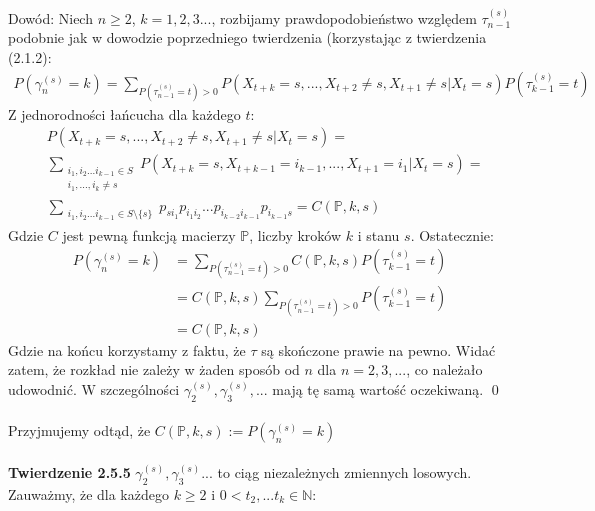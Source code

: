 \documentclass[a4paper]{article}
\begin{document}
Dowód: Niech $n\geq 2$, $k = 1,2,3...$, rozbijamy prawdopodobieństwo względem $\tau_{n-1}^{(s)}$ podobnie jak w dowodzie poprzedniego twierdzenia (korzystając z twierdzenia (2.1.2):\\
\begin{align*}
    P(\gamma_n^{(s)} = k) = \sum\limits_{P(\tau_{n-1}^{(s)} = t) > 0} P(X_{t+k} = s, ..., X_{t+2} \neq s, X_{t+1} \neq s| X_t = s)P(\tau_{k-1}^{(s)} = t) 
\end{align*}
Z jednorodności łańcucha dla każdego $t$:
\begin{align*}
    &P(X_{t+k} = s, ..., X_{t+2} \neq s, X_{t+1} \neq s| X_t = s) =\\ &\sum\limits_{\substack{i_1, i_2 ... i_{k-1} \in S\\ i_1,...,i_k \neq s}} P(X_{t+k} = s, X_{t+k-1} = i_{k-1}, ..., X_{t+1} = i_1 | X_t = s)=\\
    &\sum\limits_{\substack{i_1, i_2 ... i_{k-1} \in S\setminus \{s\}}} p_{si_1}p_{i_1 i_2}...p_{i_{k-2}i_{k-1}} p_{i_{k-1} s} = C(\mathbb{P}, k, s)
\end{align*}
Gdzie $C$ jest pewną funkcją macierzy $\mathbb{P}$, liczby kroków $k$ i stanu $s$. Ostatecznie:
\begin{align*}
    P(\gamma_n^{(s)} = k) &= \sum\limits_{P(\tau_{n-1}^{(s)} = t) > 0} C(\mathbb{P}, k, s)P(\tau_{k-1}^{(s)} = t) \\
    &= C(\mathbb{P}, k, s)\sum\limits_{P(\tau_{n-1}^{(s)} = t) > 0}P(\tau_{k-1}^{(s)} = t) \\
    &= C(\mathbb{P}, k, s)
\end{align*}
Gdzie na końcu korzystamy z faktu, że $\tau$ są skończone prawie na pewno. Widać zatem, że rozkład nie zależy w żaden sposób od $n$ dla $n = 2, 3,...$, co należało udowodnić. W szczególności $\gamma_2^{(s)}, \gamma_3^{(s)}, ...$ mają tę samą wartość oczekiwaną. \qed
\\\\
Przyjmujemy odtąd, że $C(\mathbb{P}, k, s) := P(\gamma_n^{(s)} = k)$\\
\\
\textbf{Twierdzenie 2.5.5}
$\gamma_2^{(s)}, \gamma_3^{(s)}...$ to ciąg niezależnych zmiennych losowych.\\
Zauważmy, że dla każdego $k \geq 2$ i $0 < t_2,...t_k \in \mathbb{N}$:
\end{document}
